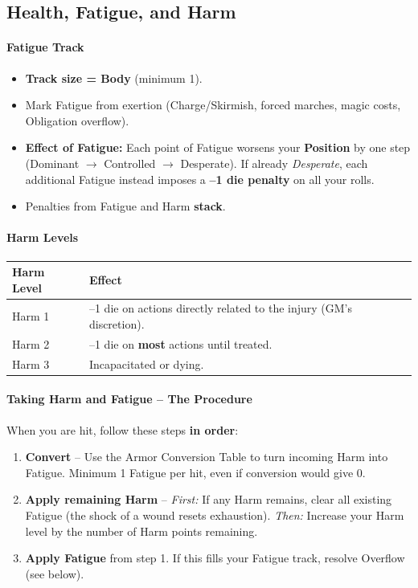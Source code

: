 \subsection{Health, Fatigue, and Harm}

\paragraph{Fatigue Track}
\begin{itemize}[leftmargin=*]
  \item \textbf{Track size = Body} (minimum 1).
  \item Mark Fatigue from exertion (Charge/Skirmish, forced marches, magic costs, Obligation overflow).
  \item \textbf{Effect of Fatigue:} Each point of Fatigue worsens your \textbf{Position} by one step (Dominant $\to$ Controlled $\to$ Desperate). If already \textit{Desperate}, each additional Fatigue instead imposes a \textbf{--1 die penalty} on all your rolls.
  \item Penalties from Fatigue and Harm \textbf{stack}.
\end{itemize}

\paragraph{Harm Levels}
\begin{center}
\begin{tabular}{ll}
\toprule
\textbf{Harm Level} & \textbf{Effect} \\
\midrule
Harm 1 & --1 die on actions directly related to the injury (GM's discretion). \\
Harm 2 & --1 die on \textbf{most} actions until treated. \\
Harm 3 & Incapacitated or dying. \\
\bottomrule
\end{tabular}
\end{center}

\paragraph{Taking Harm and Fatigue -- The Procedure}
When you are hit, follow these steps \textbf{in order}:

\begin{enumerate}[nosep]
  \item \textbf{Convert} -- Use the Armor Conversion Table to turn incoming Harm into Fatigue.  
        Minimum 1 Fatigue per hit, even if conversion would give 0.
  \item \textbf{Apply remaining Harm} --  
        \textit{First:} If any Harm remains, clear all existing Fatigue (the shock of a wound resets exhaustion).  
        \textit{Then:} Increase your Harm level by the number of Harm points remaining.
  \item \textbf{Apply Fatigue} from step 1. If this fills your Fatigue track, resolve Overflow (see below).
\end{enumerate}

